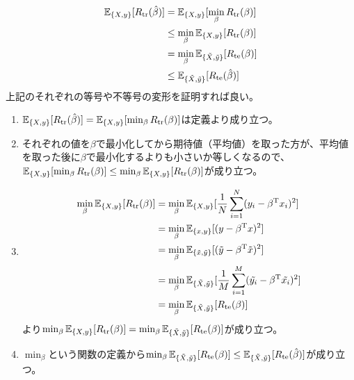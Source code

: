 \documentclass{jsarticle}
\begin{document}
\subsection{}

\subsection{}
\begin{align*}
\mathbb{E}_{\{X,y\}}[R_{\rm tr}(\hat{\beta})]&=\mathbb{E}_{\{X,y\}}[\min_{\beta}R_{\rm tr}(\beta)]\\
&\leq\min_{\beta}\mathbb{E}_{\{X,y\}}[R_{\rm tr}(\beta)]\\
&=\min_{\beta}\mathbb{E}_{\{\tilde{X},\tilde{y}\}}[R_{\rm te}(\beta)]\\
&\leq \mathbb{E}_{\{\tilde{X},\tilde{y}\}}[R_{\rm te}(\hat{\beta})]
\end{align*}
上記のそれぞれの等号や不等号の変形を証明すれば良い。\\
\begin{enumerate}
\item
$\mathbb{E}_{\{X,y\}}[R_{\rm tr}(\hat{\beta})]=\mathbb{E}_{\{X,y\}}[\min_{\beta}R_{\rm tr}(\beta)]$は定義より成り立つ。
\item
それぞれの値を$\beta$で最小化してから期待値（平均値）を取った方が、平均値を取った後に$\beta$で最小化するよりも小さいか等しくなるので、$\mathbb{E}_{\{X,y\}}[\min_{\beta}R_{\rm tr}(\beta)]\leq\min_{\beta}\mathbb{E}_{\{X,y\}}[R_{\rm tr}(\beta)]$が成り立つ。
\item
\begin{align*}
\min_{\beta}\mathbb{E}_{\{X,y\}}[R_{\rm tr}(\beta)]&=
\min_{\beta}\mathbb{E}_{\{X,y\}}[\frac{1}{N}\sum_{i=1}^{N}(y_i-\beta^{\mathrm{T}}x_i)^2]\\
&=\min_{\beta}\mathbb{E}_{\{x,y\}}[(y-\beta^{\mathrm{T}}x)^2]\\
&=\min_{\beta}\mathbb{E}_{\{\tilde{x},\tilde{y}\}}[(\tilde{y}-\beta^{\mathrm{T}}\tilde{x})^2]\\
&=\min_{\beta}\mathbb{E}_{\{\tilde{X},\tilde{y}\}}[\frac{1}{M}\sum_{i=1}^{M}(\tilde{y_i}-\beta^{\mathrm{T}}\tilde{x_i})^2]\\
&=\min_{\beta}\mathbb{E}_{\{\tilde{X},\tilde{y}\}}[R_{\rm te}(\beta)]
\end{align*}
より$\min_{\beta}\mathbb{E}_{\{X,y\}}[R_{\rm tr}(\beta)]=\min_{\beta}\mathbb{E}_{\{\tilde{X},\tilde{y}\}}[R_{\rm te}(\beta)]$が成り立つ。
\item
$\min_{\beta}$という関数の定義から$\min_{\beta}\mathbb{E}_{\{\tilde{X},\tilde{y}\}}[R_{\rm te}(\beta)]\leq \mathbb{E}_{\{\tilde{X},\tilde{y}\}}[R_{\rm te}(\hat{\beta})]$が成り立つ。
\end{enumerate}
\end{document}
